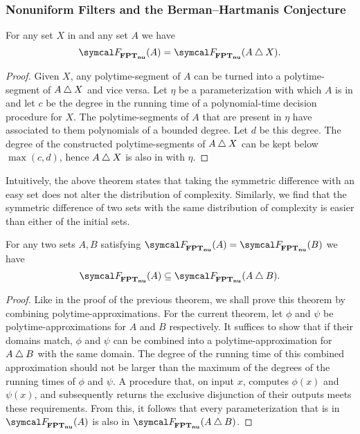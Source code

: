 \subsubsection{Nonuniform Filters and the Berman--Hartmanis Conjecture}
\begin{theorem}
\label{thm:nufptsymdiffeq}%
  For any set $X$ in  and any set $A$ we have
  \begin{equation*}
    \calF_\clnu{FPT}(A) = \calF_\clnu{FPT}(A \symdiff X).
  \end{equation*}
\end{theorem}
\begin{proof}
  Given $X$, any polytime-segment of $A$ can be turned into a polytime-segment of $A \bigtriangleup X$ and vice versa.
  Let $\eta$ be a parameterization with which $A$ is in  and let $c$ be the degree in the running time of a polynomial-time decision procedure for $X$.
  The polytime-segments of $A$ that are present in $\eta$ have associated to them polynomials of a bounded degree.
  Let $d$ be this degree.
  The degree of the constructed polytime-segments of $A \bigtriangleup X$ can be kept below $\max(c, d)$, hence $A \bigtriangleup X$ is also in  with $\eta$.
\end{proof}

Intuitively, the above theorem states that taking the symmetric difference with an easy set does not alter the distribution of complexity.
Similarly, we find that the symmetric difference of two sets with the same distribution of complexity is easier than either of the initial sets.
\begin{theorem}
\label{thm:nufptsymdiffsubeq}%
  For any two sets $A, B$ satisfying $\calF_\clnu{FPT}(A) = \calF_\clnu{FPT}(B)$ we have
  \begin{equation*}
    \calF_\clnu{FPT}(A) \subseteq \calF_\clnu{FPT}(A \symdiff B).
  \end{equation*}
\end{theorem}
\begin{proof}
  Like in the proof of the previous theorem, we shall prove this theorem by combining polytime-approximations.
  For the current theorem, let $\phi$ and $\psi$ be polytime-approximations for $A$ and $B$ respectively.
  It suffices to show that if their domains match, $\phi$ and $\psi$ can be combined into a polytime-approximation for $A \bigtriangleup B$ with the same domain.
  The degree of the running time of this combined approximation should not be larger than the maximum of the degrees of the running times of $\phi$ and $\psi$.
  A procedure that, on input $x$, computes $\phi(x)$ and $\psi(x)$, and subsequently returns the exclusive disjunction of their outputs meets these requirements.
  From this, it follows that every parameterization that is in $\calF_\clnu{FPT}(A)$ is also in $\calF_\clnu{FPT}(A \symdiff B)$.
\end{proof}

